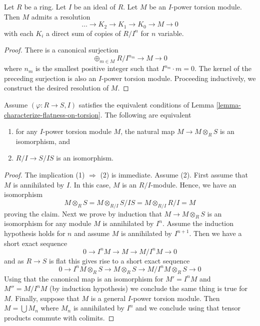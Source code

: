 \begin{lemma}
\label{lemma-I-power-torsion-presentation}
Let $R$ be a ring.
Let $I$ be an ideal of $R$.
Let $M$ be an $I$-power torsion module.
Then $M$ admits a resolution
$$
\ldots \to K_2 \to K_1 \to K_0 \to M \to 0
$$
with each $K_i$ a direct sum of copies of $R/I^n$ for $n$ variable.
\end{lemma}

\begin{proof}
There is a canonical surjection
$$
\oplus_{m \in M} R/I^{n_m} \to M \to 0
$$
where $n_m$ is the smallest positive integer such that $I^{n_m} \cdot m = 0$.
The kernel of the preceding surjection is also an $I$-power torsion module.
Proceeding inductively, we construct the desired resolution of $M$.
\end{proof}

\begin{lemma}
\label{lemma-neighbourhood-isomorphism}
Assume $(\varphi : R \to S, I)$ satisfies the equivalent conditions of
Lemma \ref{lemma-characterize-flatness-on-torsion}.
The following are equivalent
\begin{enumerate}
\item for any $I$-power torsion module $M$, the natural map
$M \to M \otimes_R S$ is an isomorphism, and
\item $R/I \to S/IS$ is an isomorphism.
\end{enumerate}
\end{lemma}

\begin{proof}
The implication (1) $\Rightarrow$ (2) is immediate.
Assume (2). First assume that $M$ is annihilated by $I$.
In this case, $M$ is an $R/I$-module. Hence, we have an isomorphism  
$$
M \otimes_R S = M \otimes_{R/I} S/IS = M \otimes_{R/I} R/I = M
$$
proving the claim. Next we prove by induction that $M \to M \otimes_R S$
is an isomorphism for any module $M$ is annihilated by $I^n$. Assume
the induction hypothesis holds for $n$ and assume $M$ is annihilated by
$I^{n + 1}$. Then we have a short exact sequence
$$
0 \to I^nM \to M \to M/I^nM \to 0
$$
and as $R \to S$ is flat this gives rise to a short exact sequence
$$
0 \to I^nM \otimes_R S \to M \otimes_R S \to M/I^nM \otimes_R S \to 0
$$
Using that the canonical map is an isomorphism for $M' = I^nM$ and
$M'' = M/I^nM$ (by induction hypothesis) we conclude the same thing is
true for $M$. Finally, suppose that $M$ is a general $I$-power torsion
module. Then $M = \bigcup M_n$ where $M_n$ is annihilated by $I^n$
and we conclude using that tensor products commute with colimits.
\end{proof}

